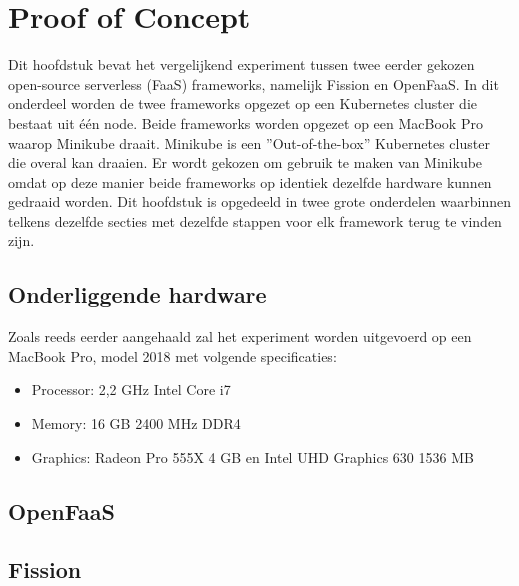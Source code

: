 \chapter{Proof of Concept}
\label{ch:proof-of-concept}
Dit hoofdstuk bevat het vergelijkend experiment tussen twee eerder gekozen open-source serverless (FaaS) frameworks, namelijk Fission en OpenFaaS. In dit onderdeel worden de twee frameworks opgezet op een Kubernetes cluster die bestaat uit één node. Beide frameworks worden opgezet op een MacBook Pro waarop Minikube draait. Minikube is een ''Out-of-the-box'' Kubernetes cluster die overal kan draaien. Er wordt gekozen om gebruik te maken van Minikube omdat op deze manier beide frameworks op identiek dezelfde hardware kunnen gedraaid worden. Dit hoofdstuk is opgedeeld in twee grote onderdelen waarbinnen telkens dezelfde secties met dezelfde stappen voor elk framework terug te vinden zijn.

\section{Onderliggende hardware}
Zoals reeds eerder aangehaald zal het experiment worden uitgevoerd op een MacBook Pro, model 2018 met volgende specificaties:
\begin{itemize}
    \item Processor: 2,2 GHz Intel Core i7
    \item Memory: 16 GB 2400 MHz DDR4
    \item Graphics: Radeon Pro 555X 4 GB en Intel UHD Graphics 630 1536 MB
\end{itemize}
\section{OpenFaaS}
\section{Fission}